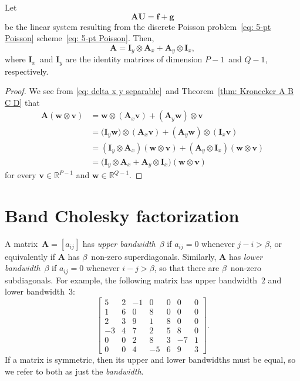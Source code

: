 \begin{theorem}\label{thm: Poisson matrix}
Let
\[
\boldsymbol{A}\boldsymbol{U}=\boldsymbol{f}+\boldsymbol{g}
\]
be the linear system resulting from the discrete Poisson 
problem~\eqref{eq: 5-pt Poisson} scheme~\eqref{eq: 5-pt Poisson}.  Then,
\[
\boldsymbol{A}=\boldsymbol{I}_y\otimes\boldsymbol{A}_x
    +\boldsymbol{A}_y\otimes\boldsymbol{I}_x,
\]
where $\boldsymbol{I}_x$~and $\boldsymbol{I}_y$ are the identity matrices of 
dimension $P-1$~and $Q-1$, respectively.
\end{theorem}
\begin{proof}
We see from \eqref{eq: delta x y separable}~and 
Theorem~\ref{thm: Kronecker A B C D} that
\begin{align*}
\boldsymbol{A}(\boldsymbol{w}\otimes\boldsymbol{v})
    &=\boldsymbol{w}\otimes(\boldsymbol{A}_x\boldsymbol{v})
    +(\boldsymbol{A}_y\boldsymbol{w})\otimes\boldsymbol{v}\\
    &=\bigl(\boldsymbol{I}_y\boldsymbol{w})
        \otimes(\boldsymbol{A}_x\boldsymbol{v})
    +(\boldsymbol{A}_y\boldsymbol{w})
        \otimes(\boldsymbol{I}_x\boldsymbol{v})\\
    &=(\boldsymbol{I}_y\otimes\boldsymbol{A}_x)
        (\boldsymbol{w}\otimes\boldsymbol{v})
    +(\boldsymbol{A}_y\otimes\boldsymbol{I}_x)
        (\boldsymbol{w}\otimes\boldsymbol{v})\\
    &=\bigl(\boldsymbol{I}_y\otimes\boldsymbol{A}_x
    +\boldsymbol{A}_y\otimes\boldsymbol{I}_x\bigr)
        (\boldsymbol{w}\otimes\boldsymbol{v})
\end{align*}
for every $\boldsymbol{v}\in\mathbb{R}^{P-1}$ and 
$\boldsymbol{w}\in\mathbb{R}^{Q-1}$.
\end{proof}


\section{Band Cholesky factorization}

A matrix~$\boldsymbol{A}=[a_{ij}]$ has \emph{upper bandwidth}~$\beta$ 
if $a_{ij}=0$ whenever $j-i>\beta$, or equivalently if $\boldsymbol{A}$ has 
$\beta$~non-zero superdiagonals.  Similarly, $\boldsymbol{A}$ has \emph{lower 
bandwidth}~$\beta$ if $a_{ij}=0$ whenever $i-j>\beta$, so that there are 
$\beta$~non-zero subdiagonals.  For example, the following matrix has upper 
bandwidth~$2$ and lower bandwidth~$3$:
\[
\begin{bmatrix}
 5& 2&-1& 0& 0& 0& 0\\
 1& 6& 0& 8& 0& 0& 0\\
 2& 3& 9& 1& 8& 0& 0\\
-3& 4& 7& 2& 5& 8& 0\\
 0& 0& 2& 8& 3&-7& 1\\
 0& 0& 4&-5& 6& 9& 3
\end{bmatrix}.
\]
If a matrix is symmetric, then its upper and lower bandwidths must be equal, so 
we refer to both as just the \emph{bandwidth}.

